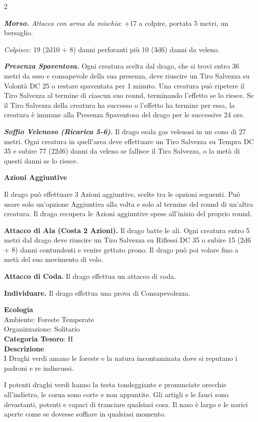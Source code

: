 \begin{multicols}{2}
{\emph{\textbf{Morso.} Attacco con arma da mischia}: +17 a colpire, portata 5 metri, un bersaglio.

\emph{Colpisce:} 19 (2d10 + 8) danni perforanti più 10 (3d6) danni da veleno.

\emph{\textbf{Presenza Spaventosa.}} Ogni creatura scelta dal drago, che si trovi entro 36 metri da esso e consapevole della sua presenza, deve riuscire un Tiro Salvezza su Volontà DC 25 o restare spaventata per 1 minuto. Una creatura può ripetere il Tiro Salvezza al termine di ciascun suo round, terminando l'effetto se lo riesce. Se il Tiro Salvezza della creatura ha successo o l'effetto ha termine per essa, la creatura è immune alla Presenza Spaventosa del drago per le successive 24 ore.

\emph{\textbf{Soffio Velenoso (Ricarica 5-6).}} Il drago esala gas velenosi in un cono di 27 metri. Ogni creatura in quell'area deve effettuare un Tiro Salvezza su Tempra DC 35 e subire 77 (22d6) danni da veleno se fallisce il Tiro Salvezza, o la metà di questi danni se lo riesce.

\textbf{Azioni Aggiuntive}

Il drago può effettuare 3 Azioni aggiuntive, scelte tra le opzioni seguenti. Può usare solo un'opzione Aggiuntiva alla volta e solo al termine del round di un'altra creatura. Il drago recupera le Azioni aggiuntive spese all'inizio del proprio round.

\textbf{Attacco di Ala (Costa 2 Azioni).} Il drago batte le ali. Ogni creatura entro 5 metri dal drago deve riuscire un Tiro Salvezza su Riflessi DC 35 o subire 15 (2d6 + 8) danni contundenti e venire gettato prono. Il drago può poi volare fino a metà del suo movimento di volo.

\textbf{Attacco di Coda.} Il drago effettua un attacco di coda.

\textbf{Individuare.} Il drago effettua una prova di Consapevolezza.

\textbf{Ecologia}\\
Ambiente: Foreste Temperate\\
Organizzazione: Solitario\\
\textbf{Categoria Tesoro}: H\\
\textbf{Descrizione}\\
I Draghi verdi amano le foreste e la natura incontaminata dove si reputano i padroni e re indiscussi.

I potenti draghi verdi hanno la testa tondeggiante e pronunciate orecchie all'indietro, le corna sono corte e non appuntite.
Gli artigli e le fauci sono devastanti, potenti e capaci di tranciare qualsiasi cosa.
Il naso è largo e le narici aperte come se dovesse soffiare in qualsiasi momento.

}
\end{multicols}
